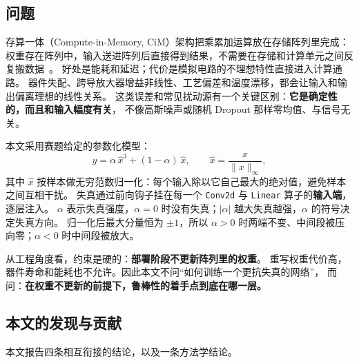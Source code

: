 \documentclass[11pt,a4paper]{ctexart}
\begin{document}
\subsection{问题}

存算一体（Compute-in-Memory, CiM）架构把乘累加运算放在存储阵列里完成：
权重存在阵列中，输入送进阵列后直接得到结果，不需要在存储和计算单元之间反复搬数据~\cite{cim_survey,puma}。
好处是能耗和延迟；代价是模拟电路的不理想特性直接进入计算通路。
器件失配、跨导放大器增益非线性、工艺偏差和温度漂移，都会让输入和输出偏离理想的线性关系。
这类误差和常见扰动源有一个关键区别：\textbf{它是确定性的，而且和输入幅度有关}，
不像高斯噪声或随机 Dropout 那样零均值、与信号无关。

本文采用赛题给定的参数化模型：
\begin{equation}
y = \alpha\,\hat{x}^3 + (1-\alpha)\,\hat{x},
\qquad
\hat{x} = \frac{x}{\|x\|_\infty},
\label{eq:distortion}
\end{equation}
其中 $\hat{x}$ 按样本做无穷范数归一化：每个输入除以它自己最大的绝对值，避免样本之间互相干扰。
失真通过前向钩子挂在每一个 \texttt{Conv2d} 与 \texttt{Linear} 算子的\textbf{输入端}，逐层注入。
$\alpha$ 表示失真强度，$\alpha=0$ 时没有失真；$|\alpha|$ 越大失真越强，$\alpha$ 的符号决定失真方向。
归一化后最大分量恒为 $\pm1$，所以 $\alpha>0$ 时两端不变、中间段被压向零；$\alpha<0$ 时中间段被放大。

从工程角度看，约束是硬的：\textbf{部署阶段不更新阵列里的权重}。
重写权重代价高，器件寿命和能耗也不允许。因此本文不问“如何训练一个更抗失真的网络”，
而问：\textbf{在权重不更新的前提下，鲁棒性的着手点到底在哪一层。}

\subsection{本文的发现与贡献}

本文报告四条相互衔接的结论，以及一条方法学结论。
\end{document}
